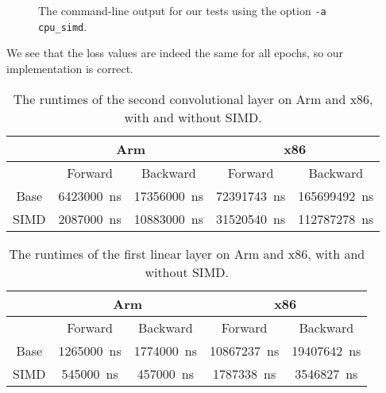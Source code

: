 \documentclass{article}
\numberwithin{equation}{section}
\numberwithin{figure}{section}
\numberwithin{table}{section}
\begin{document}
    \begin{figure}[htb]
        \inputminted{shell-session}{21mnist/cmd_output/Arm_cpu_simd.txt}
        \caption{The command-line output for our tests using the option \texttt{-a cpu_simd}.}
        \label{results:fig:cpu_simd}
    \end{figure}

    We see that the loss values are indeed the same for all epochs, so our implementation is correct.

    \begin{table}[htb]
        \begin{center}
            \begin{tabular}{c|cccc}
                & \multicolumn{2}{c}{Arm} & \multicolumn{2}{c}{x86} \\ \hline
                & Forward & Backward & Forward & Backward \\ \hline
                Base & \SI{6423000}{\nano\second} & \SI{17356000}{\nano\second} & \SI{72391743}{\nano\second} & \SI{165699492}{\nano\second} \\
                SIMD & \SI{2087000}{\nano\second} & \SI{10883000}{\nano\second} & \SI{31520540}{\nano\second} & \SI{112787278}{\nano\second}
            \end{tabular}
        \end{center}
        \caption{The runtimes of the second convolutional layer on Arm and x86, with and without SIMD.}
        \label{results:tab:runtimes_convolution}
    \end{table}

    \begin{table}[htb]
        \begin{center}
            \begin{tabular}{c|cccc}
                & \multicolumn{2}{c}{Arm} & \multicolumn{2}{c}{x86} \\ \hline
                & Forward & Backward & Forward & Backward \\ \hline
                Base & \SI{1265000}{\nano\second} & \SI{1774000}{\nano\second} & \SI{10867237}{\nano\second} & \SI{19407642}{\nano\second} \\
                SIMD & \SI{545000}{\nano\second} & \SI{457000}{\nano\second} & \SI{1787338}{\nano\second} & \SI{3546827}{\nano\second}
            \end{tabular}
        \end{center}
        \caption{The runtimes of the first linear layer on Arm and x86, with and without SIMD.}
        \label{results:tab:runtimes_linear}
    \end{table}

    \printbibliography[heading=bibintoc]
\end{document}
